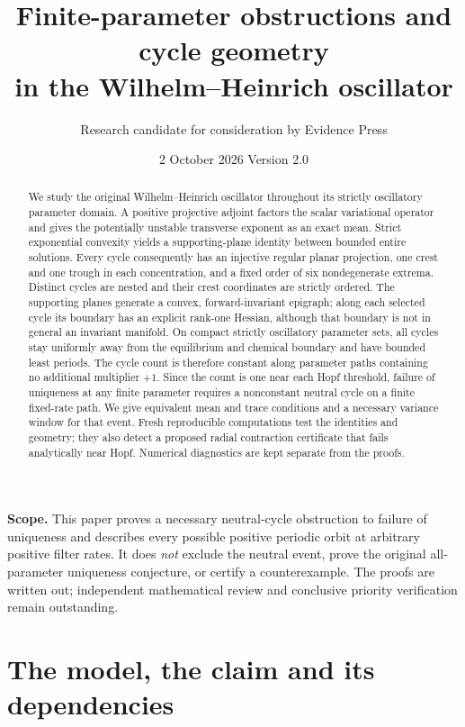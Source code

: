 \documentclass[11pt,a4paper]{article}
\title{Finite-parameter obstructions and cycle geometry\\in the Wilhelm--Heinrich oscillator}
\author{Research candidate for consideration by Evidence Press}
\date{2 October 2026 \quad Version 2.0}
\numberwithin{equation}{section}
\theoremstyle{remark}\newtheorem{remark}[theorem]{Remark}
\begin{document}
\maketitle
\thispagestyle{plain}
\noindent\textbf{Scope.} This paper proves a necessary neutral-cycle obstruction to failure of uniqueness and describes every possible positive periodic orbit at arbitrary positive filter rates. It does \emph{not} exclude the neutral event, prove the original all-parameter uniqueness conjecture, or certify a counterexample. The proofs are written out; independent mathematical review and conclusive priority verification remain outstanding.

\begin{abstract}
We study the original Wilhelm--Heinrich oscillator throughout its strictly oscillatory parameter domain. A positive projective adjoint factors the scalar variational operator and gives the potentially unstable transverse exponent as an exact mean. Strict exponential convexity yields a supporting-plane identity between bounded entire solutions. Every cycle consequently has an injective regular planar projection, one crest and one trough in each concentration, and a fixed order of six nondegenerate extrema. Distinct cycles are nested and their crest coordinates are strictly ordered. The supporting planes generate a convex, forward-invariant epigraph; along each selected cycle its boundary has an explicit rank-one Hessian, although that boundary is not in general an invariant manifold. On compact strictly oscillatory parameter sets, all cycles stay uniformly away from the equilibrium and chemical boundary and have bounded least periods. The cycle count is therefore constant along parameter paths containing no additional multiplier $+1$. Since the count is one near each Hopf threshold, failure of uniqueness at any finite parameter requires a nonconstant neutral cycle on a finite fixed-rate path. We give equivalent mean and trace conditions and a necessary variance window for that event. Fresh reproducible computations test the identities and geometry; they also detect a proposed radial contraction certificate that fails analytically near Hopf. Numerical diagnostics are kept separate from the proofs.
\end{abstract}

\section{The model, the claim and its dependencies}\label{sec:model}
\end{document}
